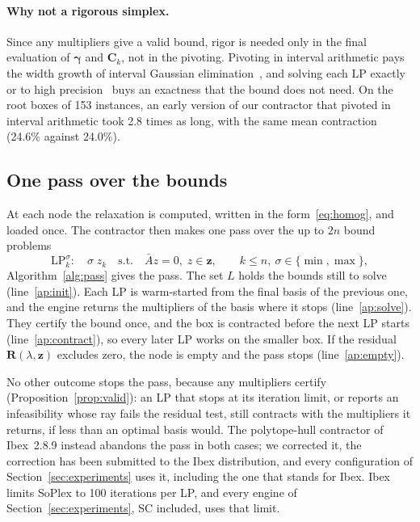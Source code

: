 \documentclass[11pt]{article}
\newcommand{\iv}[1]{\mathbf{#1}}          %
\newcommand{\Abar}{\bar{A}}
\theoremstyle{definition}
\theoremstyle{remark}
\begin{document}
\paragraph{Why not a rigorous simplex.}
Since any multipliers give a valid bound, rigor is needed only in the final
evaluation of $\iv{\gamma}$ and $\iv{C}_k$, not in the pivoting. Pivoting in
interval arithmetic pays the width growth of interval Gaussian
elimination~\cite{neumaier1990interval}, and solving each LP exactly or to high
precision~\cite{applegate2007exact,gleixner2016iterative} buys an exactness
that the bound does not need. On the root boxes of 153 instances, an early
version of our contractor that pivoted in interval arithmetic took 2.8 times as
long, with the same mean contraction (24.6\% against 24.0\%).

\subsection{One pass over the bounds}\label{sec:pass}

At each node the relaxation is computed, written in the
form~\eqref{eq:homog}, and loaded once. The contractor then makes one pass over
the up to $2n$ bound problems
\begin{equation}\label{eq:lpk}
\mathrm{LP}_k^{\sigma}:\quad \sigma\; z_k \quad\text{s.t.}\quad \Abar z = 0,\; z\in\iv{z},
\qquad k\le n,\ \sigma\in\{\min,\max\},
\end{equation}
Algorithm~\ref{alg:pass} gives the pass. The set $L$ holds the bounds still
to solve (line~\ref{ap:init}). Each LP is warm-started from the final basis of
the previous one, and the engine returns the multipliers of the basis where it
stops (line~\ref{ap:solve}). They certify the bound once, and the box is
contracted before the next LP starts (line~\ref{ap:contract}), so every later
LP works on the smaller box. If the residual $\iv{R}(\lambda,\iv{z})$ excludes
zero, the node is empty and the pass stops (line~\ref{ap:empty}).

No other outcome stops the pass, because any multipliers certify
(Proposition~\ref{prop:valid}): an LP that stops at its iteration limit, or
reports an infeasibility whose ray fails the residual test, still contracts
with the multipliers it returns, if less than an optimal basis would. The
polytope-hull contractor of Ibex~2.8.9 instead abandons the pass in both
cases; we corrected it, the correction has been submitted to the Ibex
distribution, and every configuration of Section~\ref{sec:experiments} uses
it, including the one that stands for Ibex. Ibex limits SoPlex to 100
iterations per LP, and every engine of Section~\ref{sec:experiments}, SC
included, uses that limit.
\end{document}
